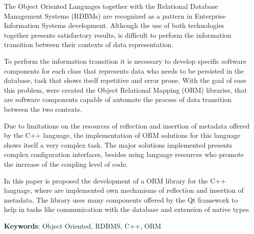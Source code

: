 The Object Oriented Languages together with the Relational Database Management Systems (RDBMs) are recognized as a pattern in Enterprise Information Systems development. Although the use of both technologies together presents satisfactory results, is difficult to perform the information transition between their contexts of data representation.

To perform the information transition it is necessary to develop specific software components for each class that represents data who needs to be persisted in the database, task that shows itself repetitive and error prone. With the goal of ease this problem, were created the Object Relational Mapping (ORM) libraries, that are software components capable of automate the process of data transition between the two contexts.

Due to limitations on the resources of reflection and insertion of metadata offered by the C++ language, the implementation of ORM solutions for this language shows itself a very complex task. The major solutions implemented presents complex configuration interfaces, besides using language resources who promote the increase of the coupling level of code.

In this paper is proposed the development of a ORM library for the C++ language, where are implemented own mechanisms of reflection and insertion of metadata. The library uses many components offered by the Qt framework to help in tasks like communication with the database and extension of native types.

{\bf{Keywords}}: Object Oriented, RDBMS, C++, ORM